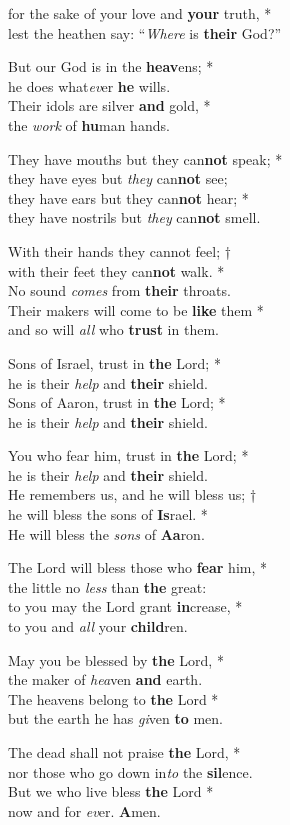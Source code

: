 for the sake of your love and \textbf{your} truth, *\\
lest the heathen say: ``\emph{Where} is \textbf{their} God?''

But our God is in the \textbf{heav}ens; *\\
he does what\emph{ev}er \textbf{he} wills.\\
Their idols are silver \textbf{and} gold, *\\
the \emph{work} of \textbf{hu}man hands.

They have mouths but they can\textbf{not} speak; *\\
they have eyes but \emph{they} can\textbf{not} see;\\
they have ears but they can\textbf{not} hear; *\\
they have nostrils but \emph{they} can\textbf{not} smell.

With their hands they cannot feel; †\\
with their feet they can\textbf{not} walk. *\\
No sound \emph{comes} from \textbf{their} throats.\\
Their makers will come to be \textbf{like} them *\\
and so will \emph{all} who \textbf{trust} in them.

Sons of Israel, trust in \textbf{the} Lord; *\\
he is their \emph{help} and \textbf{their} shield.\\
Sons of Aaron, trust in \textbf{the} Lord; *\\
he is their \emph{help} and \textbf{their} shield.

You who fear him, trust in \textbf{the} Lord; *\\
he is their \emph{help} and \textbf{their} shield.\\
He remembers us, and he will bless us; †\\
he will bless the sons of \textbf{Is}rael. *\\
He will bless the \emph{sons} of \textbf{Aa}ron.

The Lord will bless those who \textbf{fear} him, *\\
the little no \emph{less} than \textbf{the} great:\\
to you may the Lord grant \textbf{in}crease, *\\
to you and \emph{all} your \textbf{child}ren.

May you be blessed by \textbf{the} Lord, *\\
the maker of \emph{hea}ven \textbf{and} earth.\\
The heavens belong to \textbf{the} Lord *\\
but the earth he has \emph{gi}ven \textbf{to} men.

The dead shall not praise \textbf{the} Lord, *\\
nor those who go down in\emph{to} the \textbf{sil}ence.\\
But we who live bless \textbf{the} Lord *\\
now and for \emph{ev}er. \textbf{A}men.
